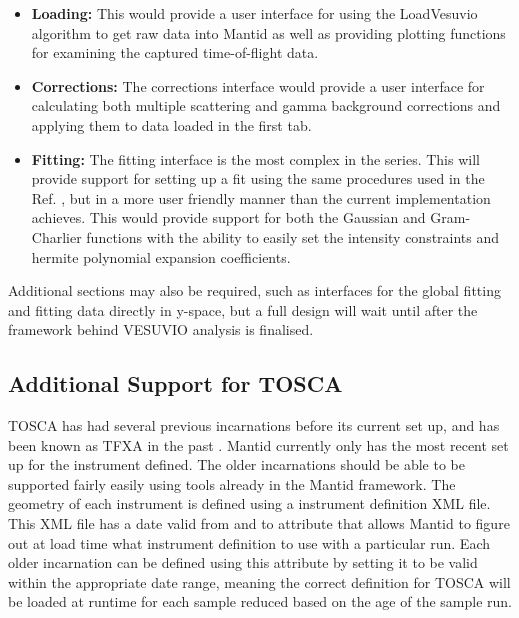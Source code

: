 \documentclass[paper=a4, fontsize=11pt]{scrartcl}	%
\numberwithin{equation}{section}															%
\numberwithin{figure}{section}																%
\numberwithin{table}{section}																%
\begin{document}
\begin{itemize}
\item \textbf{Loading:} This would provide a user interface for using the LoadVesuvio algorithm to get raw data into Mantid as well as providing plotting functions for examining the captured time-of-flight data.

\item \textbf{Corrections:} The corrections interface would provide a user interface for calculating both multiple scattering \cite{mayers2002multiple} and gamma background \cite{mayers2011calculation} corrections and applying them to data loaded in the first tab.

\item \textbf{Fitting:} The fitting interface is the most complex in the series. This will provide support for setting up a fit using the same procedures used in the Ref. \cite{mayers2010user}, but in a more user friendly manner than the current implementation achieves. This would provide support for both the Gaussian and Gram-Charlier functions with the ability to easily set the intensity constraints and hermite polynomial expansion coefficients.
\end{itemize}

Additional sections may also be required, such as interfaces for the global fitting and fitting data directly in y-space, but a full design will wait until after the framework behind VESUVIO analysis is finalised.

\subsection{Additional Support for TOSCA}
TOSCA has had several previous incarnations before its current set up, and has been known as TFXA in the past \cite{penfold1986isis, parker1997tosca, bowden2000tosca, colognesi2002tosca}. Mantid currently only has the most recent set up for the instrument defined. The older incarnations should be able to be supported fairly easily using tools already in the Mantid framework. The geometry of each instrument is defined using a instrument definition XML file. This XML file has a date valid from and to attribute that allows Mantid to figure out at load time what instrument definition to use with a particular run. Each older incarnation can be defined using this attribute by setting it to be valid within the appropriate date range, meaning the correct definition for TOSCA will be loaded at runtime for each sample reduced based on the age of the sample run. 
\end{document}
